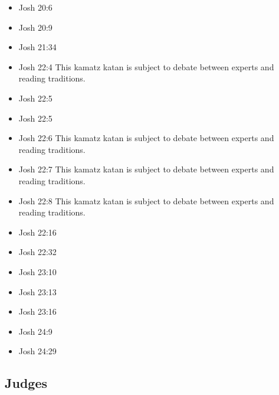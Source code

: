 \documentclass[14pt]{article}
\begin{document}
\begin{multicols}{2}
\begin{itemize}
			\item Josh 20:6
			
			\item Josh 20:9
			
			\item Josh 21:34
			
			\item Josh 22:4 This kamatz katan is subject to debate between experts and reading traditions.
			
			\item Josh 22:5
			
			\item Josh 22:5
			
			\item Josh 22:6 This kamatz katan is subject to debate between experts and reading traditions.
			
			\item Josh 22:7 This kamatz katan is subject to debate between experts and reading traditions.
			
			\item Josh 22:8 This kamatz katan is subject to debate between experts and reading traditions.
			
			\item Josh 22:16
			
			\item Josh 22:32
			
			\item Josh 23:10
			
			\item Josh 23:13
			
			\item Josh 23:16
			
			\item Josh 24:9
			
			\item Josh 24:29
			
			\end{itemize}\end{multicols}
		
		\subsection{Judges}
		
\end{document}
